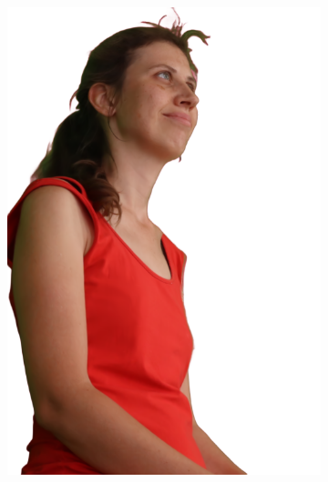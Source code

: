 \begin{figure}[!ht]
\begin{subfigure}{0.12\linewidth}
        \includegraphics[width=\textwidth]{Figures/results/initials/dora/21_render.png}

\end{subfigure}
\end{figure}
